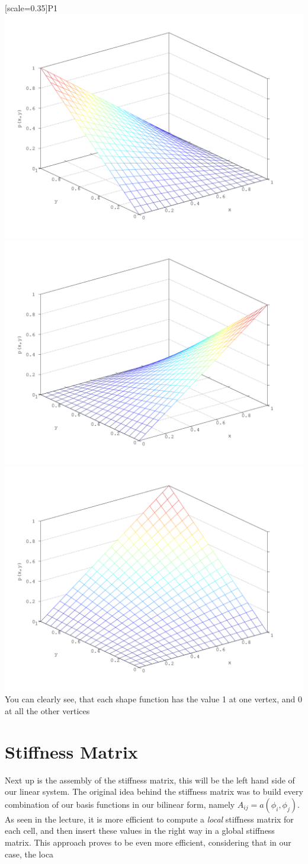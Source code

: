 \documentclass[a4paper,12pt]{article}
\begin{document}
[scale=0.35]{P1} \includegraphics[scale=0.35]{P2} \includegraphics[scale=0.35]{P3} \includegraphics[scale=0.35]{P4}
You can clearly see, that each shape function has the value 1 at one vertex, and 0 at all the other vertices

\section{Stiffness Matrix}
Next up is the assembly of the stiffness matrix, this will be the left hand side of our linear system. The original idea behind the stiffness matrix was to build every combination of our basis functions in our bilinear form, namely $A_{ij}=a(\phi_i,\phi_j)$. As seen in the lecture, it is more efficient to compute a \textit{local} stiffness matrix for each cell, and then insert these values in the right way in a global stiffness matrix. This approach proves to be even more efficient, considering that in our case, the loca
\end{document}
